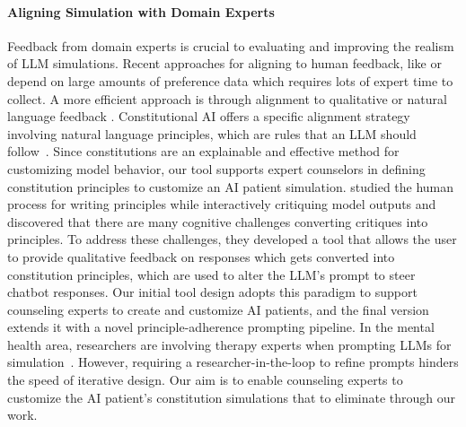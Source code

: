\documentclass[11pt]{article}
\newcommand{\raj}[1]{\ifthenelse{\boolean{showcomments}}{\textcolor{purple}{[#1 —raj]}}{}}
\begin{document}
\paragraph{Aligning Simulation with Domain Experts}
Feedback from domain experts is crucial to evaluating and improving the realism of LLM simulations. Recent approaches for aligning to human feedback, like \citet{christiano2017deep} or \citet{rafailov2024direct} depend on large amounts of preference data which requires lots of expert time to collect. A more efficient approach is through alignment to qualitative or natural language feedback \cite{shi2022life}. 
Constitutional AI offers a specific alignment strategy involving natural language principles, which are rules that an LLM should follow~\cite{bai2022constitutional}. 
Since constitutions are an explainable and effective method for customizing model behavior, our tool supports expert counselors in defining constitution principles to customize an AI patient simulation. \citet{petridis2023constitutionmaker} studied the human process for writing principles while interactively critiquing model outputs and discovered that there are many cognitive challenges converting critiques into principles. To address these challenges, they developed a tool that allows the user to provide qualitative feedback on responses which gets converted into constitution principles, which are used to alter the LLM's prompt to steer chatbot responses. Our initial tool design adopts this paradigm to support counseling experts to create and customize AI patients, and the final version extends it with a novel principle-adherence prompting pipeline.
In the mental health area, researchers are involving therapy experts when prompting LLMs for simulation~\cite{chen2023llmempowered, lin2024imbue}. 
However, requiring a researcher-in-the-loop to refine prompts hinders the speed of iterative design. Our aim is to enable counseling experts to customize the AI patient's constitution simulations that  to eliminate through our work.


\end{document}
